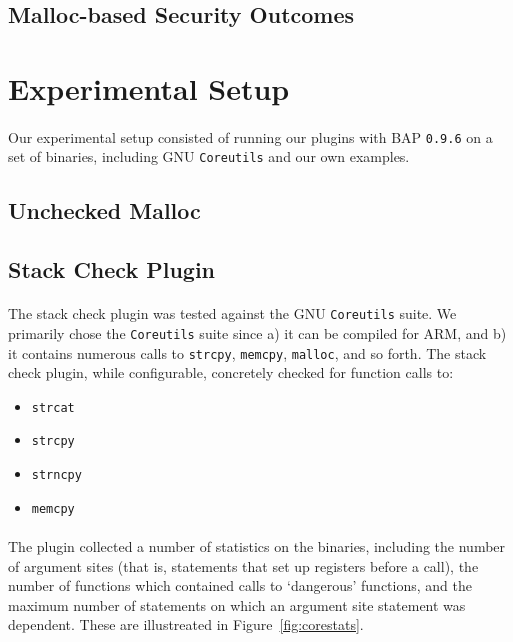 \documentclass[letterpaper,11pt]{article}
\begin{document}
\subsection{Malloc-based Security Outcomes}




\section{Experimental Setup}

\paragraph{}
Our experimental setup consisted of running our plugins with BAP \texttt{0.9.6}
\cite{bap} on a set of binaries, including GNU \texttt{Coreutils} and our
own examples.

\subsection{Unchecked Malloc}

\subsection{Stack Check Plugin}

\paragraph{}
The stack check plugin was tested against the GNU \texttt{Coreutils} suite. We
primarily chose the \texttt{Coreutils} suite since a) it can be compiled for
ARM, and b) it contains numerous calls to \texttt{strcpy}, \texttt{memcpy},
\texttt{malloc}, and so forth.  The stack check plugin, while configurable,
concretely checked for function calls to:

\begin{itemize}
  \item \texttt{strcat}
  \item \texttt{strcpy}
  \item \texttt{strncpy}
  \item \texttt{memcpy}
\end{itemize}

\paragraph{}
The plugin collected a number of statistics on the binaries, including
the number of argument sites (that is, statements that set up registers
before a call), the number of functions which contained calls to `dangerous'
functions, and the maximum number of statements on which an argument
site statement was dependent. These are illustreated in Figure~\ref{fig:corestats}.
\end{document}
